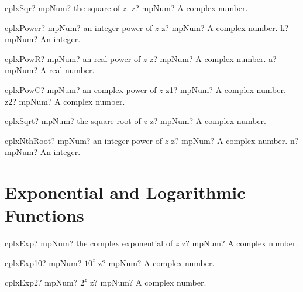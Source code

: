 \documentclass[12pt,a4paper,openany]{book}
\begin{document}
\begin{mpFunctionsExtract}
\mpFunctionOne
{cplxSqr? mpNum? the square of $z$.}
{z? mpNum? A complex number.}
\end{mpFunctionsExtract}

\begin{mpFunctionsExtract}
\mpFunctionTwo
{cplxPower? mpNum? an integer power of $z$}
{z? mpNum? A complex number.}
{k? mpNum? An integer.}
\end{mpFunctionsExtract}

\begin{mpFunctionsExtract}
\mpFunctionTwo
{cplxPowR? mpNum? an real power of $z$}
{z? mpNum? A complex number.}
{a? mpNum? A real number.}
\end{mpFunctionsExtract}

\begin{mpFunctionsExtract}
\mpFunctionTwo
{cplxPowC? mpNum? an complex power of $z$}
{z1? mpNum? A complex number.}
{z2? mpNum? A complex number.}
\end{mpFunctionsExtract}

\begin{mpFunctionsExtract}
\mpFunctionOne
{cplxSqrt? mpNum? the square root of $z$}
{z? mpNum? A complex number.}
\end{mpFunctionsExtract}

\begin{mpFunctionsExtract}
\mpFunctionTwo
{cplxNthRoot? mpNum? an integer power of $z$}
{z? mpNum? A complex number.}
{n? mpNum? An integer.}
\end{mpFunctionsExtract}

\section{Exponential and Logarithmic Functions}

\begin{mpFunctionsExtract}
\mpFunctionOne
{cplxExp? mpNum? the complex exponential of $z$}
{z? mpNum? A complex number.}
\end{mpFunctionsExtract}

\begin{mpFunctionsExtract}
\mpFunctionOne
{cplxExp10? mpNum?  $10^z$}
{z? mpNum? A complex number.}
\end{mpFunctionsExtract}

\begin{mpFunctionsExtract}
\mpFunctionOne
{cplxExp2? mpNum?  $2^z$}
{z? mpNum? A complex number.}
\end{mpFunctionsExtract}
\end{document}

